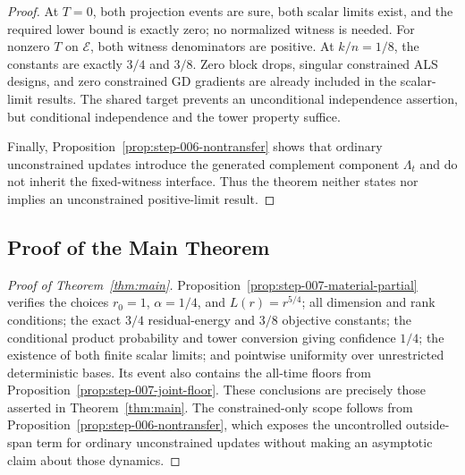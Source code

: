 \begin{proof}
At $T=0$, both projection events are sure, both scalar limits exist, and the
required lower bound is exactly zero; no normalized witness is needed.  For
nonzero $T$ on $\mathcal E$, both witness denominators are positive.  At
$k/n=1/8$, the constants are exactly $3/4$ and $3/8$.  Zero block drops,
singular constrained ALS designs, and zero constrained GD gradients are
already included in the scalar-limit results.  The shared target prevents an
unconditional independence assertion, but conditional independence and the
tower property suffice.

Finally, Proposition~\ref{prop:step-006-nontransfer} shows that ordinary
unconstrained updates introduce the generated complement component
$\Lambda_t$ and do not inherit the fixed-witness interface.  Thus the theorem
neither states nor implies an unconstrained positive-limit result.
\end{proof}

\subsection{Proof of the Main Theorem}

\begin{proof}[Proof of Theorem~\ref{thm:main}]
Proposition~\ref{prop:step-007-material-partial} verifies the choices
$r_0=1$, $\alpha=1/4$, and $L(r)=r^{5/4}$; all dimension and rank
conditions; the exact $3/4$ residual-energy and $3/8$ objective constants;
the conditional product probability and tower conversion giving confidence
$1/4$; the existence of both finite scalar limits; and pointwise uniformity
over unrestricted deterministic bases.  Its event also contains the all-time
floors from Proposition~\ref{prop:step-007-joint-floor}.  These conclusions
are precisely those asserted in Theorem~\ref{thm:main}.  The constrained-only
scope follows from Proposition~\ref{prop:step-006-nontransfer}, which exposes
the uncontrolled outside-span term for ordinary unconstrained updates without
making an asymptotic claim about those dynamics.
\end{proof}
